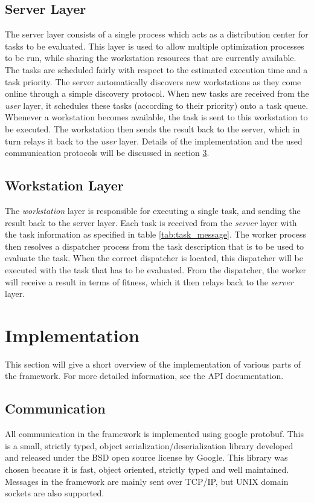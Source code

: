 \documentclass{report}
\begin{document}
\section{Server Layer}
The server layer consists of a single process which acts as a distribution
center for tasks to be evaluated. This layer is used to allow multiple
optimization processes to be run, while sharing the workstation resources that
are currently available. The tasks are scheduled fairly with respect to the estimated
execution time and a task priority. The server automatically discovers new
workstations as they come online through a simple discovery protocol. When
new tasks are received from the \textit{user} layer, it schedules these tasks
(according to their priority) onto a task queue. Whenever a workstation becomes
available, the task is sent to this workstation to be executed. The workstation
then sends the result back to the server, which in turn relays it back to the
\textit{user} layer. Details of the implementation and the used communication
protocols will be discussed in section \ref{sec:implementation}.

\section{Workstation Layer}
The \textit{workstation} layer is responsible for executing a single task, and
sending the result back to the server layer. Each task is received from
the \textit{server} layer with the task information as specified in table
\ref{tab:task_message}. The worker process then resolves a dispatcher process
from the task description that is to be used to evaluate the task. When the
correct dispatcher is located, this dispatcher will be executed with
the task that has to be evaluated. From the dispatcher, the worker will
receive a result in terms of fitness, which it then relays back to the
\textit{server} layer.

\chapter{Implementation}\label{sec:implementation}
This section will give a short overview of the implementation of various parts
of the framework. For more detailed information, see the API documentation.

\section{Communication}
All communication in the framework is implemented using google protobuf. This
is a small, strictly typed, object serialization/deserialization library
developed and released under the BSD open source license by Google. This library
was chosen because it is fast, object oriented, strictly typed and
well maintained. Messages in the framework are mainly sent over TCP/IP, but
UNIX domain sockets are also supported.
\end{document}
